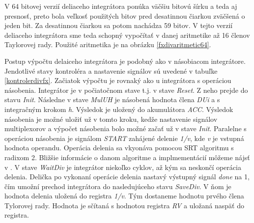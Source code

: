 V 64 bitovej verzií deliaceho integrátora ponúka väčšiu bitovú šírku a teda aj presnosť, preto bola veľkosť použitých bitov pred desatinnou čiarkou zväčšená o jeden bit. Za desatinnou čiarkou sa potom nachádza 59 bitov. V tejto verzií deliaceho integrátora sme teda schopný vypočítať v danej aritmetike až 16 členov Taylorovej rady. Použité aritmetika je na obrázku \ref{fxdivaritmetic64}.

Postup výpočtu delaiceho integrátora je podobný ako v násobiacom integrátore. Jendotlivé stavy kontroléra a nastavenie signálov sú uvedené v tabuľke \ref{kontrolerdivfx}. Začiatok výpočtu je rovnaký ako u integrátora s operáciou násobenia. Integrátor je v počiatočnom stave t.j. v stave \textit{Reset}. Z neho prejde do stavu \textit{Init}. Následne v stave \textit{MulUH} je násobená hodnota člena \textit{DUi} a s integračným krokom \textit{h}. Výsledok je uložený do akumulátora \textit{ACC}. Výsledok násobenia je možné uložiť už v tomto kroku, kedže nastavenie signálov multiplexorov a výpočet násobenia bolo možné začať už v stave \textit{Init}. Paralelne s operáciou násobenia je signálom \textit{START} zahájené delenie \textit{1/v}, kde \textit{v} je vstupná hodnota operandu. Operácia delenia sa vkyonáva pomocou SRT algoritmu s radixom 2. Bližšie informácie o danom algoritme a implmementácií môžeme nájsť v \cite{MatecnyBP}. V stave \textit{WaitDiv} je integrátor niekoľko cyklov, až kým sa neskončí operácia delenia. Delička po vykonaní operácie delenia nastavý výstupný signál \textit{done} na 1, čím umožní prechod integrátora do nasledujúceho stavu \textit{SaveDiv}. V ňom je hodnota delenia uložená do registra \textit{1/v}. Tým dostaneme hodnotu prvého člena Tylorovej rady. Hodnota je sčítaná s hodnotou registra \textit{RV} a uložaná naspäť do registra.


